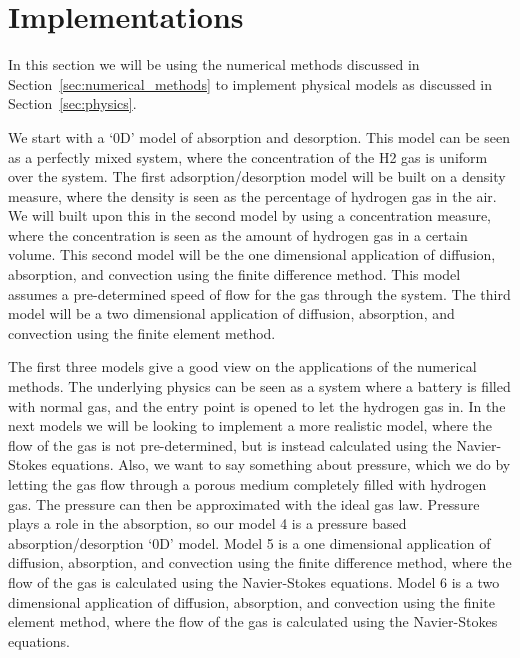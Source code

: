 \section{Implementations}\label{sec:implementations}

In this section we will be using the numerical methods discussed in Section~\ref{sec:numerical_methods} to implement physical models as discussed in Section~\ref{sec:physics}.

We start with a `0D' model of absorption and desorption. This model can be seen as a perfectly mixed system, where the concentration of the H2 gas is uniform over the system. The first adsorption/desorption model will be built on a density measure, where the density is seen as the percentage of hydrogen gas in the air. We will built upon this in the second model by using a concentration measure, where the concentration is seen as the amount of hydrogen gas in a certain volume. This second model will be the one dimensional application of diffusion, absorption, and convection using the finite difference method. This model assumes a pre-determined speed of flow for the gas through the system. The third model will be a two dimensional application of diffusion, absorption, and convection using the finite element method.

The first three models give a good view on the applications of the numerical methods. The underlying physics can be seen as a system where a battery is filled with normal gas, and the entry point is opened to let the hydrogen gas in. In the next models we will be looking to implement a more realistic model, where the flow of the gas is not pre-determined, but is instead calculated using the Navier-Stokes equations. Also, we want to say something about pressure, which we do by letting the gas flow through a porous medium completely filled with hydrogen gas. The pressure can then be approximated with the ideal gas law. Pressure plays a role in the absorption, so our model 4 is a pressure based absorption/desorption `0D' model. Model 5 is a one dimensional application of diffusion, absorption, and convection using the finite difference method, where the flow of the gas is calculated using the Navier-Stokes equations. Model 6 is a two dimensional application of diffusion, absorption, and convection using the finite element method, where the flow of the gas is calculated using the Navier-Stokes equations.